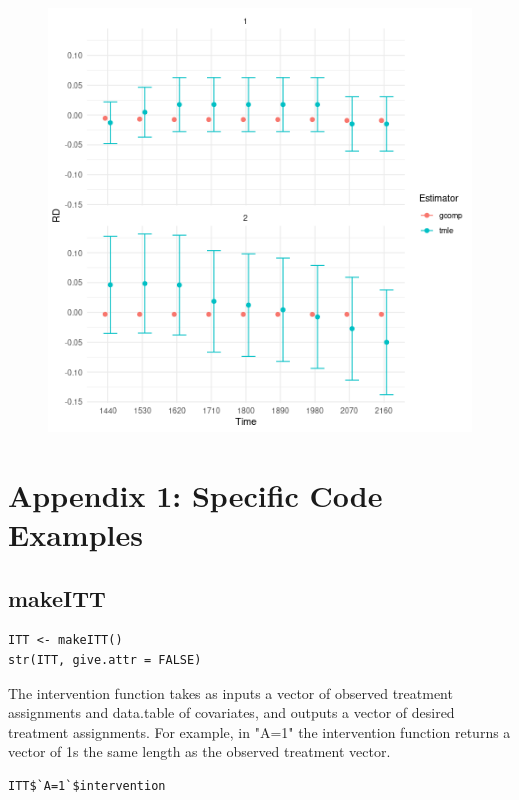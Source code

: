 \documentclass{report}
\newcommand{\1}{\ensuremath{\mathbf{1}}}
\begin{document}
\begin{figure}[H]
\includegraphics[width=0.9\linewidth]{concrete-pbc.png}
\end{figure}

\section{Appendix 1: Specific Code Examples}
\label{sec:org08546e5}
\subsection{makeITT}
\label{sec:orgf06ecba}

\begin{lstlisting}
ITT <- makeITT()
str(ITT, give.attr = FALSE)
\end{lstlisting}

The intervention function takes as inputs a vector of observed treatment assignments and data.table of covariates, and outputs a vector of desired treatment assignments. For example, in "A=1" the intervention function returns a vector of 1s the same length as the observed treatment vector.

\begin{lstlisting}
ITT$`A=1`$intervention
\end{lstlisting}
\end{document}
